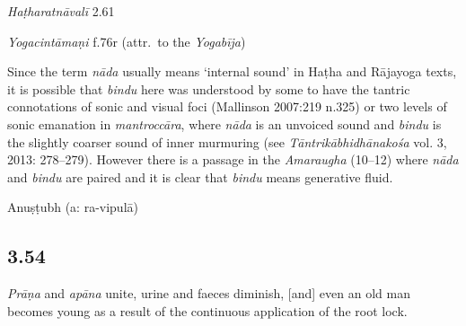 \begin{ekdosis}
\begin{sources}[hp03_053]
\end{sources}

\begin{testimonia}[hp03_053]
\emph{Haṭharatnāvalī} 2.61
\begin{versinnote}
\end{versinnote}

\emph{Yogacintāmaṇi} f.76r (attr.~to the \emph{Yogabīja})
\begin{versinnote}
\end{versinnote}

\end{testimonia}

\begin{philcomm}[hp03_053]
Since the term \emph{nāda} usually means `internal sound' in Haṭha and Rājayoga texts, it is possible that \emph{bindu} here was understood by some to have the tantric connotations of sonic and visual foci (Mallinson 2007:219 n.325) or two levels of sonic emanation in \emph{mantroccāra}, where \emph{nāda} is an unvoiced sound and \emph{bindu} is the slightly coarser sound of inner murmuring (see \emph{Tāntrikābhidhānakośa} vol. 3, 2013: 278–279). However there is a passage in the \emph{Amaraugha} (10–12) where \emph{nāda} and \emph{bindu} are paired and it is clear that \emph{bindu} means generative fluid. 
\end{philcomm}


\begin{metre}[hp03_053]
Anuṣṭubh (a: ra-vipulā)
\end{metre}

\subsection*{3.54}
\begin{translation}[hp03_054]
\textit{Prāṇa} and \textit{apāna} unite, urine and faeces diminish, [and] even an old man becomes young as a result of the continuous application of the root lock.
\end{translation}


\end{ekdosis}
